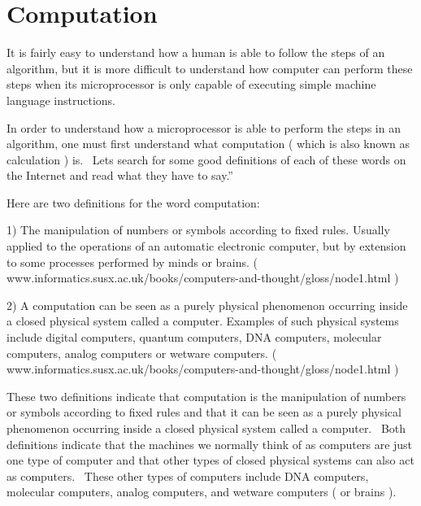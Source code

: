 \documentclass[12pt,twoside]{book}
\begin{document}
\section[Computation]{Computation}

It is fairly easy to understand how a human is able to follow the steps of an algorithm, but it is more difficult to understand how computer can perform these steps when its microprocessor is only capable of executing simple machine language instructions. 

\bigskip

In order to understand how a microprocessor is able to perform the steps in an algorithm, one must first understand what computation ( which is also known as calculation ) is. \ Lets search for some good definitions of each of these words on the Internet and read what they have to say.'' 

\bigskip

Here are two definitions for the word computation:


\bigskip

1) The manipulation of numbers or symbols according to fixed rules. Usually applied to the operations of an automatic electronic computer, but by extension to some processes performed by minds or brains. ( www.informatics.susx.ac.uk/books/computers{}-and{}-thought/gloss/node1.html ) 

\bigskip

2) A computation can be seen as a purely physical phenomenon occurring inside a closed physical system called a computer. Examples of such physical systems include digital computers, quantum computers, DNA computers, molecular computers, analog computers or wetware computers. ( www.informatics.susx.ac.uk/books/computers{}-and{}-thought/gloss/node1.html ) 

\bigskip


\bigskip

These two definitions indicate that computation is the {\textquotedbl}manipulation of numbers or symbols according to fixed rules{\textquotedbl} and that it {\textquotedbl}can be seen as a purely physical phenomenon occurring inside a closed physical system called a computer.{\textquotedbl} \ Both definitions indicate that the machines we normally think of as computers are just one type of computer and that other types of closed physical systems can also act as computers. \ These other types of computers include DNA computers, molecular computers, analog computers, and wetware computers ( or brains ). 
\end{document}
